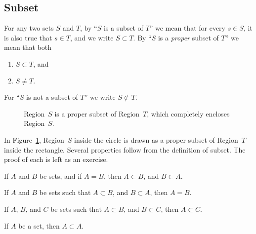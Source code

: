 \subsection{Subset}

\begin{definition}
   For any two sets $S$ and $T$, by ``$S$ is a subset of $T$'' we mean that for
   every $s \in S$, it is also true that $s \in T$, and we write $S \subset T$.
   By ``$S$ is a \emph{proper} subset of $T$'' we mean that both
   \begin{enumerate}
      \item $S \subset T$, and
      \item $S \neq T$.
   \end{enumerate}
   For ``$S$ is not a subset of $T$'' we write $S \not\subset T$.
\end{definition}

\begin{figure}
   \begin{center}
   \end{center}
   \caption{Region~$S$ is a proper subset of Region~$T$, which completely
   encloses Region~$S$.}
\label{fig:proper-subset}
\end{figure}

\noindent In Figure~\ref{fig:proper-subset}, Region~$S$ inside the circle is
drawn as a proper subset of Region~$T$ inside the rectangle.  Several
properties follow from the definition of subset. The proof of each is left as
an exercise.

\begin{lemma}
   If $A$ and $B$ be sets, and if $A = B$, then $A \subset B$, and $B \subset
   A$.
\label{prop:mutual-subsets}
\end{lemma}

\begin{lemma}
   If $A$ and $B$ be sets such that $A \subset B$, and $B \subset A$, then $A =
   B$.
\end{lemma}

\begin{lemma}
   If $A$, $B$, and $C$ be sets such that $A \subset B$, and $B \subset C$,
   then $A \subset C$.
\end{lemma}

\begin{lemma}
   If $A$ be a set, then $A \subset A$.
\end{lemma}

